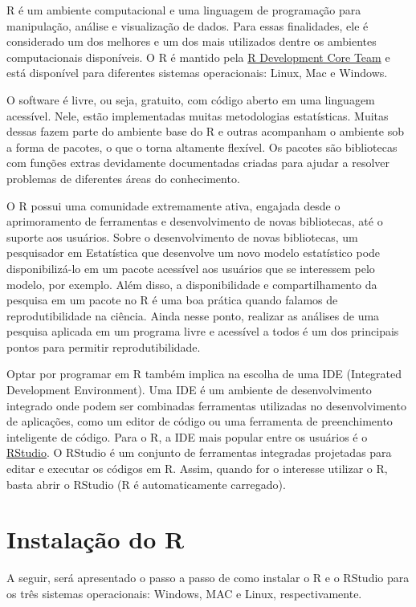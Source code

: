 \documentclass[
  letterpaper,
  DIV=11,
  numbers=noendperiod]{scrreprt}
\begin{document}
R é um ambiente computacional e uma linguagem de programação para
manipulação, análise e visualização de dados. Para essas finalidades,
ele é considerado um dos melhores e um dos mais utilizados dentre os
ambientes computacionais disponíveis. O R é mantido pela
\href{https://cran.r-project.org/}{R Development Core Team} e está
disponível para diferentes sistemas operacionais: Linux, Mac e Windows.

O software é livre, ou seja, gratuito, com código aberto em uma
linguagem acessível. Nele, estão implementadas muitas metodologias
estatísticas. Muitas dessas fazem parte do ambiente base do R e outras
acompanham o ambiente sob a forma de pacotes, o que o torna altamente
flexível. Os pacotes são bibliotecas com funções extras devidamente
documentadas criadas para ajudar a resolver problemas de diferentes
áreas do conhecimento.

O R possui uma comunidade extremamente ativa, engajada desde o
aprimoramento de ferramentas e desenvolvimento de novas bibliotecas, até
o suporte aos usuários. Sobre o desenvolvimento de novas bibliotecas, um
pesquisador em Estatística que desenvolve um novo modelo estatístico
pode disponibilizá-lo em um pacote acessível aos usuários que se
interessem pelo modelo, por exemplo. Além disso, a disponibilidade e
compartilhamento da pesquisa em um pacote no R é uma boa prática quando
falamos de reprodutibilidade na ciência. Ainda nesse ponto, realizar as
análises de uma pesquisa aplicada em um programa livre e acessível a
todos é um dos principais pontos para permitir reprodutibilidade.

Optar por programar em R também implica na escolha de uma IDE
(Integrated Development Environment). Uma IDE é um ambiente de
desenvolvimento integrado onde podem ser combinadas ferramentas
utilizadas no desenvolvimento de aplicações, como um editor de código ou
uma ferramenta de preenchimento inteligente de código. Para o R, a IDE
mais popular entre os usuários é o \href{https://rstudio.com}{RStudio}.
O RStudio é um conjunto de ferramentas integradas projetadas para editar
e executar os códigos em R. Assim, quando for o interesse utilizar o R,
basta abrir o RStudio (R é automaticamente carregado).

\hypertarget{instalauxe7uxe3o-do-r}{%
\section{Instalação do R}\label{instalauxe7uxe3o-do-r}}

A seguir, será apresentado o passo a passo de como instalar o R e o
RStudio para os três sistemas operacionais: Windows, MAC e Linux,
respectivamente.
\end{document}
